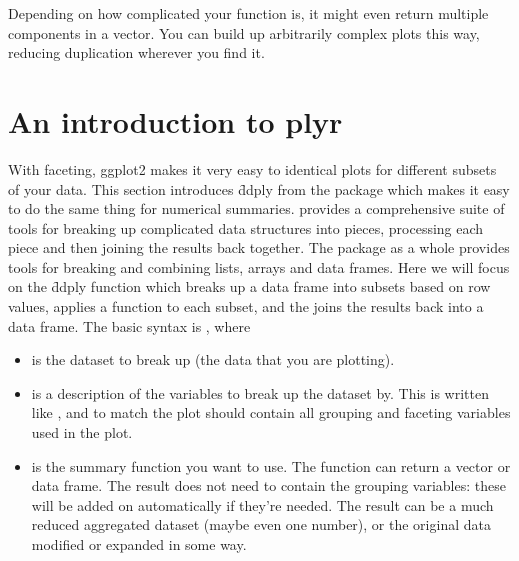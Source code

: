 Depending on how complicated your function is, it might even return multiple components in a vector. You can build up arbitrarily complex plots this way, reducing duplication wherever you find it.

% 



\section{An introduction to plyr}
\label{sec:plyr}

With faceting, ggplot2 makes it very easy to identical plots for different subsets of your data. This section introduces \f{ddply} from the  package which makes it easy to do the same thing for numerical summaries.  provides a comprehensive suite of tools for breaking up complicated data structures into pieces, processing each piece and then joining the results back together. The  package as a whole provides tools for breaking and combining lists, arrays and data frames. Here we will focus on the \f{ddply} function which breaks up a data frame into subsets based on row values, applies a function to each subset, and the joins the results back into a data frame. The basic syntax is , where

\begin{itemize}
  \item {} is the dataset to break up (the data that you are plotting).
  
  \item {} is a description of the variables to break up the dataset by.  This is written like , and to match the plot should contain all grouping and faceting variables used in the plot.
  
  \item {} is the summary function you want to use.  The function can return a vector or data frame.  The result does not need to contain the grouping variables: these will be added on automatically if they're needed.  The result can be a much reduced aggregated dataset (maybe even one number), or the original data modified or expanded in some way.

\end{itemize}

